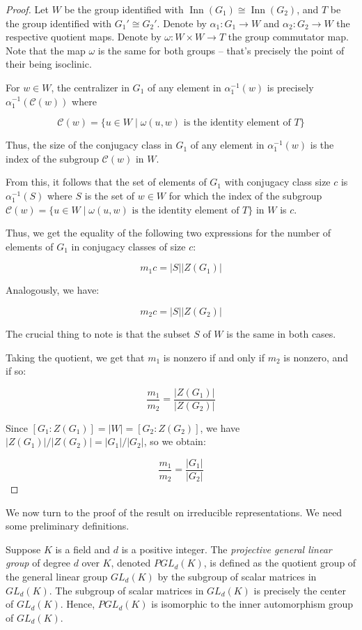 \documentclass{ucetd}
\begin{document}
\begin{proof}
  Let $W$ be the group identified with $\operatorname{Inn}(G_1) \cong
  \operatorname{Inn}(G_2)$, and $T$ be the group identified with $G_1'
  \cong G_2'$. Denote by $\alpha_1: G_1 \to W$ and $\alpha_2: G_2 \to
  W$ the respective quotient maps. Denote by $\omega: W \times W \to
  T$ the group commutator map. Note that the map $\omega$ is the same
  for both groups -- that's precisely the point of their being
  isoclinic.

  For $w \in W$, the centralizer in $G_1$ of any element in
  $\alpha_1^{-1}(w)$ is precisely $\alpha_1^{-1}(\mathcal{C}(w))$
  where
  
  $$\mathcal{C}(w) = \{ u \in W \mid \omega(u,w) \mbox{ is the identity element of } T \}$$

  Thus, the size of the conjugacy class in $G_1$ of any element in
  $\alpha_1^{-1}(w)$ is the index of the subgroup $\mathcal{C}(w)$ in $W$.
 
  From this, it follows that the set of elements of $G_1$ with
  conjugacy class size $c$ is $\alpha_1^{-1}(S)$ where $S$ is the set
  of $w \in W$ for which the index of the subgroup $\mathcal{C}(w) =
  \{ u \in W \mid \omega(u,w) \mbox{ is the identity element of } T
  \}$ in $W$ is $c$.

  Thus, we get the equality of the following two expressions for the
  number of elements of $G_1$ in conjugacy classes of size $c$:

  $$m_1c = |S||Z(G_1)|$$

  Analogously, we have:

  $$m_2c = |S||Z(G_2)|$$

  The crucial thing to note is that the subset $S$ of $W$ is the same
  in both cases.

  Taking the quotient, we get that $m_1$ is nonzero if and only if
  $m_2$ is nonzero, and if so:

  $$\frac{m_1}{m_2} = \frac{|Z(G_1)|}{|Z(G_2)|}$$

  Since $[G_1:Z(G_1)] = |W| = [G_2:Z(G_2)]$, we have 
  $|Z(G_1)|/|Z(G_2)| = |G_1|/|G_2|$, so we obtain:

  $$\frac{m_1}{m_2} = \frac{|G_1|}{|G_2|}$$

\end{proof}

We now turn to the proof of the result on irreducible
representations. We need some preliminary definitions.

\begin{definer}
  Suppose $K$ is a field and $d$ is a positive integer. The {\em
    projective general linear group} of degree $d$ over $K$, denoted
  $PGL_d(K)$, is defined as the quotient group of the general linear
  group $GL_d(K)$ by the subgroup of scalar matrices in $GL_d(K)$. The
  subgroup of scalar matrices in $GL_d(K)$ is precisely the center of
  $GL_d(K)$. Hence, $PGL_d(K)$ is isomorphic to the inner automorphism
  group of $GL_d(K)$.
\end{definer}
\end{document}
